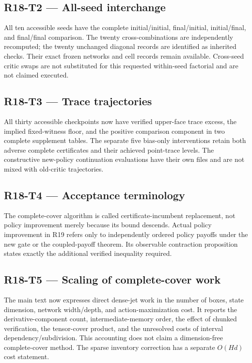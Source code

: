 \subsection{R18-T2 --- All-seed interchange}
All ten accessible seeds have the complete initial/initial, final/initial, initial/final, and final/final comparison. The twenty cross-combinations are independently recomputed; the twenty unchanged diagonal records are identified as inherited checks. Their exact frozen networks and cell records remain available. Cross-seed critic swaps are not substituted for this requested within-seed factorial and are not claimed executed.

\subsection{R18-T3 --- Trace trajectories}
All thirty accessible checkpoints now have verified upper-face trace excess, the implied fixed-witness floor, and the positive comparison component in two complete supplement tables. The separate five bias-only interventions retain both adverse complete certificates and their achieved point-trace levels. The constructive new-policy continuation evaluations have their own files and are not mixed with old-critic trajectories.

\subsection{R18-T4 --- Acceptance terminology}
The complete-cover algorithm is called certificate-incumbent replacement, not policy improvement merely because its bound descends. Actual policy improvement in R19 refers only to independently ordered policy payoffs under the new gate or the coupled-payoff theorem. Its observable contraction proposition states exactly the additional verified inequality required.

\subsection{R18-T5 --- Scaling of complete-cover work}
The main text now expresses direct dense-jet work in the number of boxes, state dimension, network width/depth, and action-maximization cost. It reports the derivative-component count, intermediate-memory order, the effect of chunked verification, the tensor-cover product, and the unresolved costs of interval dependency/subdivision. This accounting does not claim a dimension-free complete-cover method. The sparse inventory correction has a separate $O(Hd)$ cost statement.

